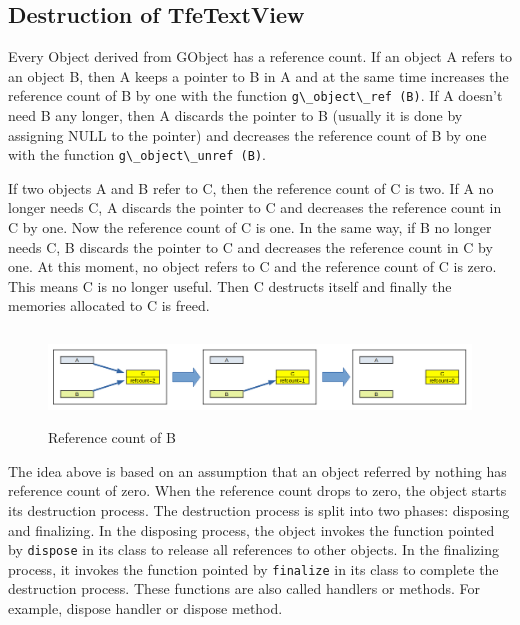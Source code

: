 \hypertarget{destruction-of-tfetextview}{%
\subsection{Destruction of
TfeTextView}\label{destruction-of-tfetextview}}

Every Object derived from GObject has a reference count. If an object A
refers to an object B, then A keeps a pointer to B in A and at the same
time increases the reference count of B by one with the function
\passthrough{\lstinline!g\_object\_ref (B)!}. If A doesn't need B any
longer, then A discards the pointer to B (usually it is done by
assigning NULL to the pointer) and decreases the reference count of B by
one with the function \passthrough{\lstinline!g\_object\_unref (B)!}.

If two objects A and B refer to C, then the reference count of C is two.
If A no longer needs C, A discards the pointer to C and decreases the
reference count in C by one. Now the reference count of C is one. In the
same way, if B no longer needs C, B discards the pointer to C and
decreases the reference count in C by one. At this moment, no object
refers to C and the reference count of C is zero. This means C is no
longer useful. Then C destructs itself and finally the memories
allocated to C is freed.

\begin{figure}
\centering
\includegraphics[width=15.855cm,height=2.475cm]{../image/refcount.png}
\caption{Reference count of B}
\end{figure}

The idea above is based on an assumption that an object referred by
nothing has reference count of zero. When the reference count drops to
zero, the object starts its destruction process. The destruction process
is split into two phases: disposing and finalizing. In the disposing
process, the object invokes the function pointed by
\passthrough{\lstinline!dispose!} in its class to release all references
to other objects. In the finalizing process, it invokes the function
pointed by \passthrough{\lstinline!finalize!} in its class to complete
the destruction process. These functions are also called handlers or
methods. For example, dispose handler or dispose method.

